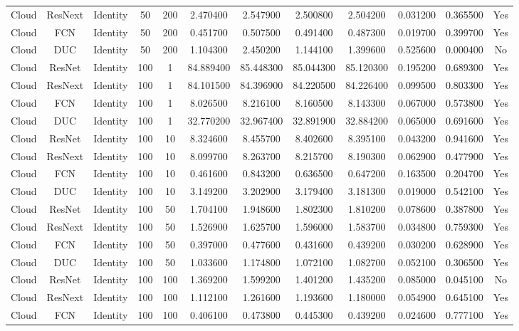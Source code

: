\begin{tabular}{|c||c||c||c||c||c||c||c||c||c||c||c|}
Cloud & ResNext & Identity & 50 & 200 & 2.470400 & 2.547900 & 2.500800 & 2.504200 & 0.031200 & 0.365500 & Yes \\
Cloud & FCN & Identity & 50 & 200 & 0.451700 & 0.507500 & 0.491400 & 0.487300 & 0.019700 & 0.399700 & Yes \\
Cloud & DUC & Identity & 50 & 200 & 1.104300 & 2.450200 & 1.144100 & 1.399600 & 0.525600 & 0.000400 & No \\
Cloud & ResNet & Identity & 100 & 1 & 84.889400 & 85.448300 & 85.044300 & 85.120300 & 0.195200 & 0.689300 & Yes \\
Cloud & ResNext & Identity & 100 & 1 & 84.101500 & 84.396900 & 84.220500 & 84.226400 & 0.099500 & 0.803300 & Yes \\
Cloud & FCN & Identity & 100 & 1 & 8.026500 & 8.216100 & 8.160500 & 8.143300 & 0.067000 & 0.573800 & Yes \\
Cloud & DUC & Identity & 100 & 1 & 32.770200 & 32.967400 & 32.891900 & 32.884200 & 0.065000 & 0.691600 & Yes \\
Cloud & ResNet & Identity & 100 & 10 & 8.324600 & 8.455700 & 8.402600 & 8.395100 & 0.043200 & 0.941600 & Yes \\
Cloud & ResNext & Identity & 100 & 10 & 8.099700 & 8.263700 & 8.215700 & 8.190300 & 0.062900 & 0.477900 & Yes \\
Cloud & FCN & Identity & 100 & 10 & 0.461600 & 0.843200 & 0.636500 & 0.647200 & 0.163500 & 0.204700 & Yes \\
Cloud & DUC & Identity & 100 & 10 & 3.149200 & 3.202900 & 3.179400 & 3.181300 & 0.019000 & 0.542100 & Yes \\
Cloud & ResNet & Identity & 100 & 50 & 1.704100 & 1.948600 & 1.802300 & 1.810200 & 0.078600 & 0.387800 & Yes \\
Cloud & ResNext & Identity & 100 & 50 & 1.526900 & 1.625700 & 1.596000 & 1.583700 & 0.034800 & 0.759300 & Yes \\
Cloud & FCN & Identity & 100 & 50 & 0.397000 & 0.477600 & 0.431600 & 0.439200 & 0.030200 & 0.628900 & Yes \\
Cloud & DUC & Identity & 100 & 50 & 1.033600 & 1.174800 & 1.072100 & 1.082700 & 0.052100 & 0.306500 & Yes \\
Cloud & ResNet & Identity & 100 & 100 & 1.369200 & 1.599200 & 1.401200 & 1.435200 & 0.085000 & 0.045100 & No \\
Cloud & ResNext & Identity & 100 & 100 & 1.112100 & 1.261600 & 1.193600 & 1.180000 & 0.054900 & 0.645100 & Yes \\
Cloud & FCN & Identity & 100 & 100 & 0.406100 & 0.473800 & 0.445300 & 0.439200 & 0.024600 & 0.777100 & Yes \\

\end{tabular}
